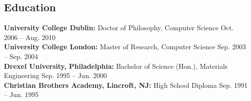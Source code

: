 \documentclass[line,a4paper]{resume}
\begin{document}
\begin{resume}
    \section{\mysidestyle Education}\vspace{3mm}
    \textbf{University College Dublin:}  Doctor of Philosophy, Computer Science \hfill Oct. 2006 -- Aug. 2010 \vspace{2mm}\\%
     \textbf{University College London:}  Master of Research, Computer Science \hfill Sep. 2003 -- Sep. 2004 \vspace{2mm}\\%
     \textbf{Drexel University, Philadelphia:}  Bachelor of Science (Hon.), Materials Engineering \hfill Sep. 1995 -- Jun. 2000 \vspace{2mm}\\%
     \textbf{Christian Brothers Academy, Lincroft, NJ:}  High School Diploma \hfill Sep. 1991 -- Jun. 1995 \vspace{1mm}\\%

\end{resume}
\end{document}

